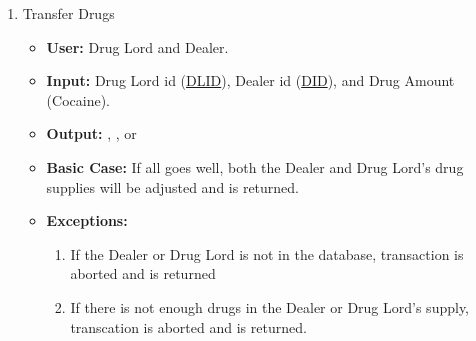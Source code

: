 \documentclass[11pt, oneside]{article}   	%
\theoremstyle{definition}
\theoremstyle{remark}
\begin{document}
\begin{enumerate}


	\item Transfer Drugs
	\begin{itemize}
		\item \textbf{User:} Drug Lord and Dealer.
		\item \textbf{Input:} Drug Lord id (\underline{DLID}), Dealer id (\underline{DID}), and Drug Amount (Cocaine).
		\item \textbf{Output:} , , or 
		\item \textbf{Basic Case:} If all goes well, both the Dealer and Drug Lord's drug supplies will be adjusted and  is returned.
		\item \textbf{Exceptions:}
		\begin{enumerate}
			\item If the Dealer or Drug Lord is not in the database, transaction is aborted and  is returned
			\item If there is not enough drugs in the Dealer or Drug Lord's supply, transcation is aborted and  is returned.
		\end{enumerate}
	\end{itemize}
		

\end{enumerate}
\end{document}
